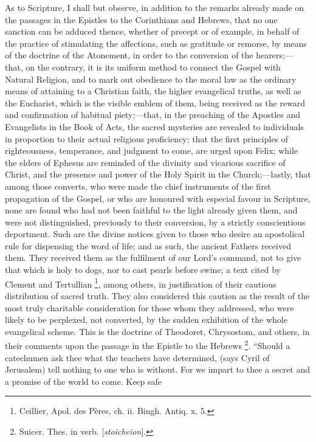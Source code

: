 As to Scripture, I shall but observe, in addition to the remarks
already made on the passages in the Epistles to the Corinthians and
Hebrews, that no one sanction can be adduced thence, whether of
precept or of example, in behalf of the practice of stimulating the
affections, such as gratitude or remorse, by means of the doctrine of
the Atonement, in order to the conversion of the hearers;—that, on
the contrary, it is its uniform method to connect the Gospel with
Natural Religion, and to mark out obedience to the moral law as
the ordinary means of attaining to a Christian faith, the higher
evangelical truths, as well as the Eucharist, which is the visible
emblem of them, being received as the reward and confirmation of
habitual piety;—that, in the preaching of the Apostles and
Evangelists in the Book of Acts, the sacred mysteries are revealed to
individuals in proportion to their actual religious proficiency; that
the first principles of righteousness, temperance, and judgment to
come, are urged upon Felix; while the elders of Ephesus are reminded
of the divinity and vicarious sacrifice of Christ, and the presence
and power of the Holy Spirit in the Church;—lastly, that among those
converts, who were made the chief instruments of the first propagation
of the Gospel, or who are honoured with especial favour in Scripture,
none are found who had not been faithful to the light already given
them, and were not distinguished, previously to their conversion, by a
strictly conscientious deportment. Such are the divine notices given
to those who desire an apostolical rule for dispensing the word of
life; and as such, the ancient Fathers received them. They received
them as the fulfilment of our Lord's command, not to give that which
is holy to dogs, nor to cast pearls before swine; a text cited by
Clement and Tertullian \footnote{Ceillier, Apol. des Pères, ch. ii. Bingh.
Antiq. x. 5.},
among others, in justification of their cautious distribution of
sacred truth. They also considered this caution as the result of the
most truly charitable consideration for those whom they addressed, who
were likely to be perplexed, not converted, by the sudden exhibition
of the whole evangelical scheme. This is the doctrine of Theodoret,
Chrysostom, and others, in their comments upon the passage in the
Epistle to the Hebrews \footnote{Suicer. Thes. in verb. [\emph{stoicheion}].}.
``Should a catechumen ask thee what the teachers have determined,
(says Cyril of Jerusalem) tell nothing to one who is without. For we
impart to thee a secret and a promise of the world to come. Keep safe
